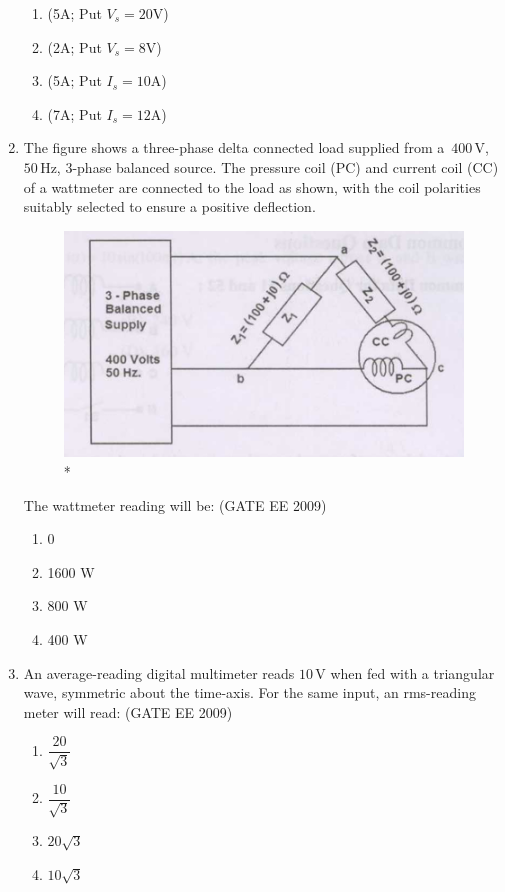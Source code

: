 \documentclass[journal,12pt,onecolumn]{IEEEtran}
\theoremstyle{remark}
\begin{document}
\begin{flushleft}
\begin{enumerate}
\begin{enumerate}
    

\item (5A; Put $V_s = 20$V) 
\item  (2A; Put $V_s = 8$V) 
\item  (5A; Put $I_s = 10$A) 
\item  (7A; Put $I_s = 12$A) 
\end{enumerate}
 

\item The figure shows a three-phase delta connected load supplied from a \(\,400 \, \mathrm{V}\),
\(50\, \mathrm{Hz}\), 3-phase balanced source. The pressure coil (PC) and current coil (CC) of a wattmeter are
connected to the load as shown, with the coil polarities suitably selected to ensure a positive deflection.


\begin{figure}[H]
    \centering
    \includegraphics[width=0.5\columnwidth]{figs/Screenshot 2025-08-09 102914.png}
    \caption{*}
    \label{fig:placeholder}
\end{figure}
The wattmeter reading will be:
\hfill(GATE EE 2009)
\begin{enumerate}
    
\item 0 
\item 1600 W 
\item 800 W 
\item 400 W
\end{enumerate}


\item An average-reading digital multimeter reads \(10 \, \mathrm{V}\) when fed with a triangular wave,
symmetric about the time-axis. For the same input, an rms-reading meter will read:
\hfill(GATE EE 2009)
\begin{enumerate}
    

\item \(\dfrac{20}{\sqrt{3}}\) 
\item \(\dfrac{10}{\sqrt{3}}\) 
\item \(20\sqrt{3}\) 
\item  \(10\sqrt{3}\)
\end{enumerate}


\end{enumerate}
\end{flushleft}
\end{document}
